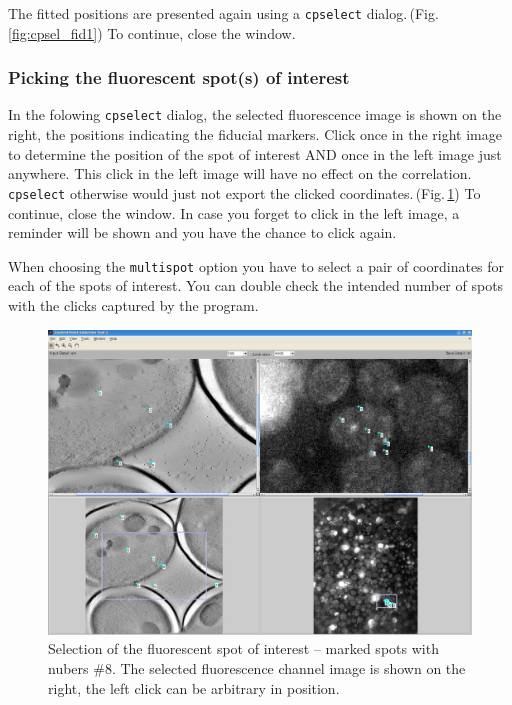 \documentclass[10pt,a4paper,onepage,DIV12]{scrartcl}
\begin{document}
The fitted positions are presented again using a \texttt{cpselect} dialog.\,(Fig.\,\ref{fig:cpsel_fid1}) To continue, close the window.


%  

% 

\subsubsection{Picking the fluorescent spot(s) of interest}
In the folowing \texttt{cpselect} dialog, the selected fluorescence image is shown on the right, the positions indicating the fiducial markers. Click once in the right image to determine the position of the spot of interest AND once in the left image just anywhere. This click in the left image will have no effect on the correlation. \texttt{cpselect} otherwise would just not export the clicked coordinates.\,(Fig.\,\ref{fig:cpsel_fluor1}) To continue, close the window. In case you forget to click in the left image, a reminder will be shown and you have the chance to click again. 

When choosing the \texttt{multispot} option you have to select a pair of coordinates for each of the spots of interest. You can double check the intended number of spots with the clicks captured by the program.
\begin{figure}
 \centering
 \includegraphics[width=.78\textwidth]{images/cpsel_fluor1.jpg}
 \caption{Selection of the fluorescent spot of interest -- marked spots with nubers \#8. The selected fluorescence channel image is shown on the right, the left click can be arbitrary in position.}
 \label{fig:cpsel_fluor1}
\end{figure}
\end{document}
